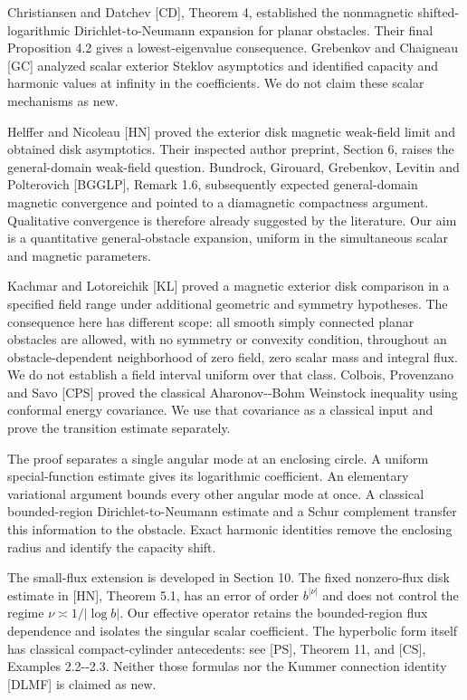 \documentclass[11pt]{article}
\begin{document}
Christiansen and Datchev {[}CD{]}, Theorem 4, established the
nonmagnetic shifted-logarithmic Dirichlet-to-Neumann expansion for
planar obstacles. Their final Proposition 4.2 gives a lowest-eigenvalue
consequence. Grebenkov and Chaigneau {[}GC{]} analyzed scalar exterior
Steklov asymptotics and identified capacity and harmonic values at
infinity in the coefficients. We do not claim these scalar mechanisms as
new.

Helffer and Nicoleau {[}HN{]} proved the exterior disk magnetic
weak-field limit and obtained disk asymptotics. Their inspected author
preprint, Section 6, raises the general-domain weak-field question.
Bundrock, Girouard, Grebenkov, Levitin and Polterovich {[}BGGLP{]},
Remark 1.6, subsequently expected general-domain magnetic convergence
and pointed to a diamagnetic compactness argument. Qualitative
convergence is therefore already suggested by the literature. Our aim is
a quantitative general-obstacle expansion, uniform in the simultaneous
scalar and magnetic parameters.

Kachmar and Lotoreichik {[}KL{]} proved a magnetic exterior disk
comparison in a specified field range under additional geometric and
symmetry hypotheses. The consequence here has different scope: all
smooth simply connected planar obstacles are allowed, with no symmetry
or convexity condition, throughout an obstacle-dependent neighborhood of
zero field, zero scalar mass and integral flux. We do not establish a
field interval uniform over that class. Colbois, Provenzano and Savo
{[}CPS{]} proved the classical Aharonov-\/-Bohm Weinstock inequality
using conformal energy covariance. We use that covariance as a classical
input and prove the transition estimate separately.

The proof separates a single angular mode at an enclosing circle. A
uniform special-function estimate gives its logarithmic coefficient. An
elementary variational argument bounds every other angular mode at once.
A classical bounded-region Dirichlet-to-Neumann estimate and a Schur
complement transfer this information to the obstacle. Exact harmonic
identities remove the enclosing radius and identify the capacity shift.

The small-flux extension is developed in Section 10. The fixed
nonzero-flux disk estimate in {[}HN{]}, Theorem 5.1, has an error of
order \(b^{|\nu|}\) and does not control the regime
\(\nu\asymp1/|\log b|\). Our effective operator retains the
bounded-region flux dependence and isolates the singular scalar
coefficient. The hyperbolic form itself has classical compact-cylinder
antecedents: see {[}PS{]}, Theorem 11, and {[}CS{]}, Examples
2.2-\/-2.3. Neither those formulas nor the Kummer connection identity
{[}DLMF{]} is claimed as new.
\end{document}
